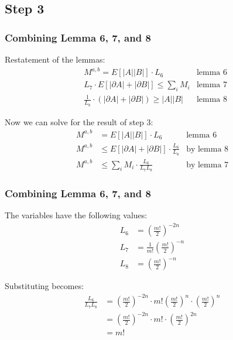 \documentclass[aspectratio=169]{beamer}
\begin{document}
	\subsection{Step 3}
		\begin{frame}
			\frametitle{Combining Lemma 6, 7, and 8}

			Restatement of the lemmas:
			\begin{align*}
				&M^{a,b} = E[|A||B|] \cdot L_6 & \textrm{lemma 6} \\
				&L_7 \cdot E[|\partial A| + |\partial B|] \le \sum_i M_i & \textrm{lemma 7} \\
				&\frac{1}{L_8} \cdot (|\partial A| + |\partial B|) \ge |A||B| & \textrm{lemma 8}
			\end{align*}

			Now we can solve for the result of step 3:
			\begin{align*}
				M^{a,b} &= E[|A||B|] \cdot L_6 & \textrm{lemma 6} \\
				M^{a,b} &\le E[|\partial A| + |\partial B|] \cdot \frac{L_6}{L_8} & \textrm{by lemma 8} \\
				M^{a,b} &\le \sum_i M_i \cdot \frac{L_6}{L_7L_8} & \textrm{by lemma 7}
			\end{align*}

		\end{frame}

		\begin{frame}
			\frametitle{Combining Lemma 6, 7, and 8}

			The variables have the following values:
			\begin{align*}
				L_6 &= \left(\frac{m!}{2}\right)^{-2n} \\
				L_7 &= \frac{1}{m!}\left(\frac{m!}{2}\right)^{-n} \\
				L_8 &= \left(\frac{m!}{2}\right)^{-n}
			\end{align*}

			Substituting becomes:
			\begin{align*}
				\frac{L_6}{L_7L_8} &= \left(\frac{m!}{2}\right)^{-2n} \cdot m!\left(\frac{m!}{2}\right)^{n} \cdot \left(\frac{m!}{2}\right)^{n} \\
				&= \left(\frac{m!}{2}\right)^{-2n} \cdot m! \cdot \left(\frac{m!}{2}\right)^{2n} \\
				&= m!
			\end{align*}
		\end{frame}
\end{document}
